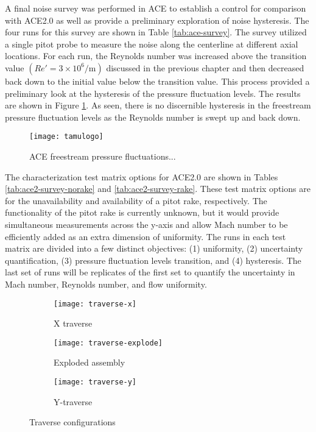 A final noise survey was performed in ACE to establish a control for comparison with ACE2.0 as well as provide a preliminary exploration of noise hysteresis. The four runs for this survey are shown in Table \ref{tab:ace-survey}. The survey utilized a single pitot probe to measure the noise along the centerline at different axial locations. For each run, the Reynolds number was increased above the transition value $\left(Re' = 3 \times 10^6/\mathrm{m}\right)$ discussed in the previous chapter and then decreased back down to the initial value below the transition value. This process provided a preliminary look at the hysteresis of the pressure fluctuation levels. The results are shown in Figure \ref{fig:ace-survey}. As seen, there is no discernible hysteresis in the freestream pressure fluctuation levels as the Reynolds number is swept up and back down. 

\begin{figure}[ht!]
    \centering
    \texttt{[image: tamulogo]}
    \caption{ACE freestream pressure fluctuations...}
    \label{fig:ace-survey}
\end{figure}

The characterization test matrix options for ACE2.0 are shown in Tables \ref{tab:ace2-survey-norake} and \ref{tab:ace2-survey-rake}. These test matrix options are for the unavailability and availability of a pitot rake, respectively. The functionality of the pitot rake is currently unknown, but it would provide simultaneous measurements across the y-axis and allow Mach number to be efficiently added as an extra dimension of uniformity. The runs in each test matrix are divided into a few distinct objectives: (1) uniformity, (2) uncertainty quantification, (3) pressure fluctuation levels transition, and (4) hysteresis. The last set of runs will be replicates of the first set to quantify the uncertainty in Mach number, Reynolds number, and flow uniformity.

\begin{figure}[ht!]
    \centering
    \begin{subfigure}[b]{0.4\textwidth}
            \texttt{[image: traverse-x]}
        \caption{X traverse}
        \label{fig:traverse-x}
    \end{subfigure}
    \begin{subfigure}[b]{0.22\textwidth}
            \texttt{[image: traverse-explode]}
        \caption{Exploded assembly}
        \label{fig:traverse-explode}
    \end{subfigure}
    \begin{subfigure}[b]{0.35\textwidth}
            \texttt{[image: traverse-y]}
        \caption{Y-traverse}
        \label{fig:traverse-y}
    \end{subfigure}
    \caption{Traverse configurations}
    \label{fig:traverse}
\end{figure}

